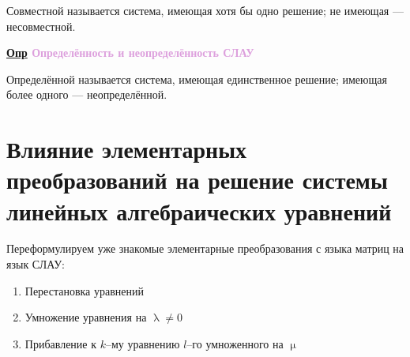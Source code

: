 \documentclass[12pt, a4paper]{report}
\newcommand{\vect}[3][n]{\IfEqCase{#1}%
										{%
											{l}{\vv{\mathbf{#2}}}%
											{l*}{\vv*{\mathbf{#2}}{#3}}%
											{c}{\smash{\underset{\downarrow}{\mathbf{#2}}}_{#3}}%
											{n}{\mathbf{#2}_{#3}}%
										}}%
\newcommand{\df}[1][]{\begin{flushleft}\textbf{\underline{Опр} \textcolor{Plum}{#1}}\end{flushleft}}
\begin{document}
	Совместной называется система, имеющая хотя бы одно решение; не имеющая --- несовместной.
	\df[Определённость и неопределённость СЛАУ]
	
	Определённой называется система, имеющая единственное решение; имеющая более одного \nolinebreak--- неопределённой.
	\newpage\section[Влияние ЭП на решение СЛАУ]{Влияние элементарных преобразований на решение системы линейных алгебраических уравнений}
	
	Переформулируем уже знакомые элементарные преобразования с языка матриц на язык СЛАУ:
	
	\begin{enumerate}[1)]\item Перестановка уравнений \item Умножение уравнения на \(\uplambda\neq 0\) \item Прибавление к \(k\)--му уравнению \(l\)--го умноженного на \(\upmu\)\end{enumerate}
	
\end{document}

